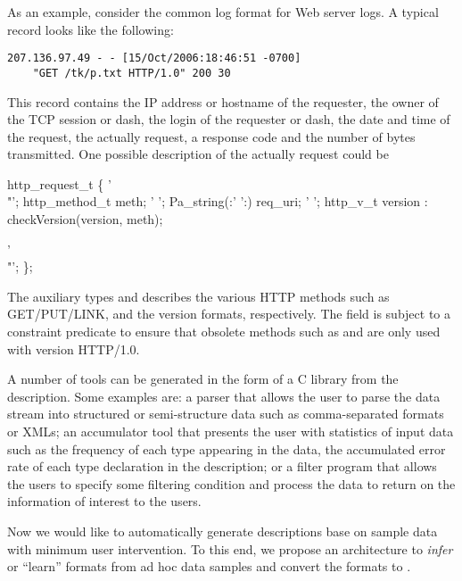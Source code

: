 \documentclass{article}
\begin{document}
As an example, consider the common log format for Web server logs.  A
typical record looks like the following:
{\small \begin{verbatim}
207.136.97.49 - - [15/Oct/2006:18:46:51 -0700] 
	"GET /tk/p.txt HTTP/1.0" 200 30
\end{verbatim}
}

This record contains the IP address or hostname of the requester, the owner of
the TCP session or dash, the login of the requester or dash, the date and time of 
the request, the actually request, a response code and the number of bytes transmitted.
One possible \padsc{} description of the actually request could be
\begin{code}
 http_request_t \{
  '\\"'; http_method_t    meth;           
  ' ';  Pa_string(:' ':) req_uri;        
  ' ';  http_v_t version : 
	checkVersion(version, meth);
                                         
  '\\"';
\};
\end{code}

The auxiliary types  and  describes the various
HTTP methods such as GET/PUT/LINK, and the version formats, respectively.
The  field is subject to a constraint predicate 
to ensure that obsolete methods such as  and  are only
used with version HTTP/1.0.

A number of tools can be generated in the form of a C library from the
\padsc{} description. Some examples are: a parser that allows the user to
parse the data stream into structured or semi-structure data such as
comma-separated formats or XMLs; an accumulator tool that presents the user with 
statistics of input data such as the frequency of each type appearing in
the data, the accumulated error rate of each type declaration in the
\padsc{} description; or a filter program that allows the users to specify
some filtering condition and process the data to return on the information
of interest to the users. 

Now we would like to automatically generate \padsc{} descriptions base on
sample data with minimum user intervention. To this end, 
we propose an architecture to {\em infer} or ``learn'' \cite{higuera01current} 
formats from ad hoc data samples and convert the formats to \padsc{}. 
\end{document}

